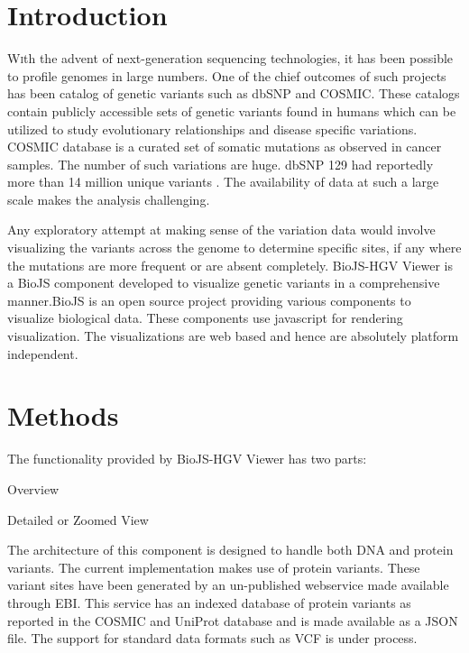 \documentclass[twoside]{article}
\begin{document}
\begin{multicols}{2} %

\section{Introduction}

\lettrine[nindent=0em,lines=3]{W} 
ith the advent of next-generation sequencing technologies, it has been possible to profile genomes in large numbers. One of the chief outcomes of such projects has been catalog of genetic variants such as dbSNP\cite{Smigielski2000} and COSMIC\cite{Forbes2011}. These catalogs contain publicly accessible sets of genetic variants found in humans which can be utilized to  study evolutionary relationships and disease specific variations. COSMIC database is a curated set of somatic mutations as observed in cancer samples. The number of such variations are   huge. dbSNP 129 had reportedly more than 14 million unique variants \cite{ncbiweb}. The availability of data at such a large scale makes the analysis challenging.

Any exploratory attempt at making sense of the variation data would involve visualizing the variants across the genome to determine specific sites, if any where the mutations are more frequent or are absent completely. 
 BioJS-HGV Viewer is a BioJS \cite{Corpas2014} component developed to visualize genetic variants in a comprehensive manner.BioJS is an open source project providing various components to visualize biological data. These components use javascript for rendering visualization. The visualizations are web based and hence are absolutely platform independent.
 
 

\section{Methods}
The functionality provided by BioJS-HGV Viewer has two parts:\\
\begin{compactitem}
\item Overview
\item Detailed or Zoomed View
\end{compactitem}
The architecture of this component is designed to handle both DNA and protein variants. The current implementation makes use of protein variants. These variant sites have been generated by an un-published webservice made available through EBI. This service has an indexed database of protein variants as reported in the COSMIC and UniProt\cite{Wu2006} database and is made available as a JSON\cite{json} file. The support for standard data formats such as VCF\cite{vcf} is under process.

\end{multicols}
\end{document}
